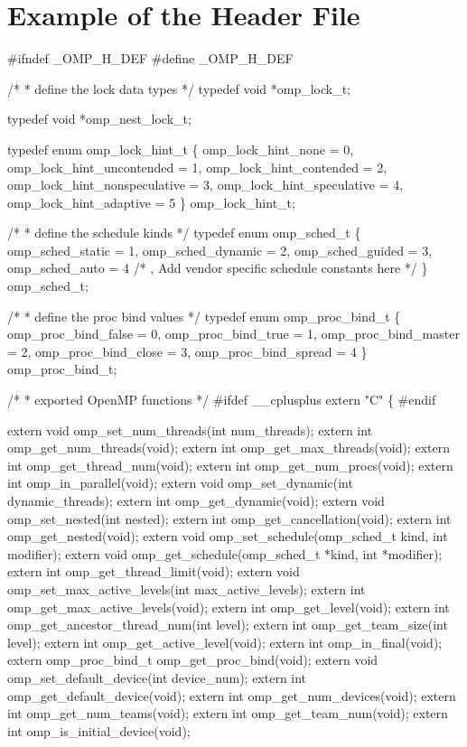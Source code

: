 \section{Example of the  Header File}
\label{sec:Example of the omp.h Header File}
{\small \begin{codepar}
\#ifndef \_OMP\_H\_DEF
\#define \_OMP\_H\_DEF

/*
 * define the lock data types
 */
typedef void *omp\_lock\_t;

typedef void *omp\_nest\_lock\_t;

typedef enum omp\_lock\_hint\_t 
\{
 omp\_lock\_hint\_none = 0,
 omp\_lock\_hint\_uncontended = 1,
 omp\_lock\_hint\_contended = 2,
 omp\_lock\_hint\_nonspeculative = 3,
 omp\_lock\_hint\_speculative = 4,
 omp\_lock\_hint\_adaptive = 5
\} omp\_lock\_hint\_t;

/*
 * define the schedule kinds
 */
typedef enum omp\_sched\_t
\{
 omp\_sched\_static = 1,
 omp\_sched\_dynamic = 2,
 omp\_sched\_guided = 3,
 omp\_sched\_auto = 4
/* , Add vendor specific schedule constants here */
\} omp\_sched\_t;

/*
* define the proc bind values 
*/ 
typedef enum omp\_proc\_bind\_t
\{
 omp\_proc\_bind\_false = 0,
 omp\_proc\_bind\_true = 1,
 omp\_proc\_bind\_master = 2,
 omp\_proc\_bind\_close = 3,
 omp\_proc\_bind\_spread = 4
\} omp\_proc\_bind\_t; 

/*
 * exported OpenMP functions
 */
\#ifdef _\_cplusplus
extern "C"
\{
\#endif

extern void omp\_set\_num\_threads(int num\_threads);
extern int omp\_get\_num\_threads(void);
extern int omp\_get\_max\_threads(void);
extern int omp\_get\_thread\_num(void);
extern int omp\_get\_num\_procs(void);
extern int omp\_in\_parallel(void);
extern void omp\_set\_dynamic(int dynamic\_threads);
extern int omp\_get\_dynamic(void);
extern void omp\_set\_nested(int nested);
extern int omp\_get\_cancellation(void);
extern int omp\_get\_nested(void);
extern void omp\_set\_schedule(omp\_sched\_t kind, int modifier);
extern void omp\_get\_schedule(omp\_sched\_t *kind, int *modifier);
extern int omp\_get\_thread\_limit(void);
extern void omp\_set\_max\_active\_levels(int max\_active\_levels);
extern int omp\_get\_max\_active\_levels(void);
extern int omp\_get\_level(void);
extern int omp\_get\_ancestor\_thread\_num(int level);
extern int omp\_get\_team\_size(int level);
extern int omp\_get\_active\_level(void);
extern int omp\_in\_final(void);
extern omp\_proc\_bind\_t omp\_get\_proc\_bind(void);
extern void omp\_set\_default\_device(int device\_num);
extern int omp\_get\_default\_device(void);
extern int omp\_get\_num\_devices(void);
extern int omp\_get\_num\_teams(void);
extern int omp\_get\_team\_num(void);
extern int omp\_is\_initial\_device(void);


\end{codepar}}
